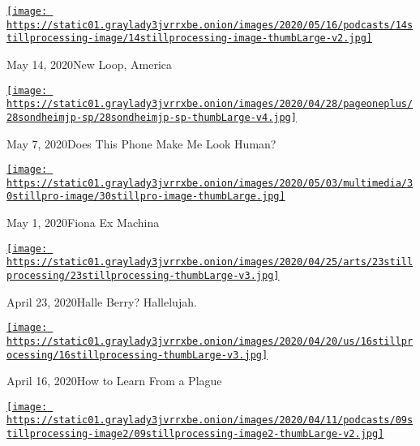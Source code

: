 \href{https://www.nytimes3xbfgragh.onion/2020/05/14/podcasts/still-processing-westworld-hollywood-utopia-dystopia.html?action=click\&module=audio-series-bar\&region=header\&pgtype=Article}{\texttt{[image: https://static01.graylady3jvrrxbe.onion/images/2020/05/16/podcasts/14stillprocessing-image/14stillprocessing-image-thumbLarge-v2.jpg]}}

May 14, 2020New Loop, America

\href{https://www.nytimes3xbfgragh.onion/2020/05/07/podcasts/still-processing-internet-vulnerability-sondheim-parks-recreation.html?action=click\&module=audio-series-bar\&region=header\&pgtype=Article}{\texttt{[image: https://static01.graylady3jvrrxbe.onion/images/2020/04/28/pageoneplus/28sondheimjp-sp/28sondheimjp-sp-thumbLarge-v4.jpg]}}

May 7, 2020Does This Phone Make Me Look Human?

\href{https://www.nytimes3xbfgragh.onion/2020/04/30/podcasts/still-processing-fiona-apple-fetch-bolt-cutters.html?action=click\&module=audio-series-bar\&region=header\&pgtype=Article}{\texttt{[image: https://static01.graylady3jvrrxbe.onion/images/2020/05/03/multimedia/30stillpro-image/30stillpro-image-thumbLarge.jpg]}}

May 1, 2020Fiona Ex Machina

\href{https://www.nytimes3xbfgragh.onion/2020/04/23/podcasts/still-processing-halle-berry-sharon-stone-catwoman-quarantine.html?action=click\&module=audio-series-bar\&region=header\&pgtype=Article}{\texttt{[image: https://static01.graylady3jvrrxbe.onion/images/2020/04/25/arts/23stillprocessing/23stillprocessing-thumbLarge-v3.jpg]}}

April 23, 2020Halle Berry? Hallelujah.

\href{https://www.nytimes3xbfgragh.onion/2020/04/16/podcasts/still-processing-AIDS-survive-coronavirus.html?action=click\&module=audio-series-bar\&region=header\&pgtype=Article}{\texttt{[image: https://static01.graylady3jvrrxbe.onion/images/2020/04/20/us/16stillprocessing/16stillprocessing-thumbLarge-v3.jpg]}}

April 16, 2020How to Learn From a Plague

\href{https://www.nytimes3xbfgragh.onion/2020/04/09/podcasts/still-processing-tiger-king.html?action=click\&module=audio-series-bar\&region=header\&pgtype=Article}{\texttt{[image: https://static01.graylady3jvrrxbe.onion/images/2020/04/11/podcasts/09stillprocessing-image2/09stillprocessing-image2-thumbLarge-v2.jpg]}}

